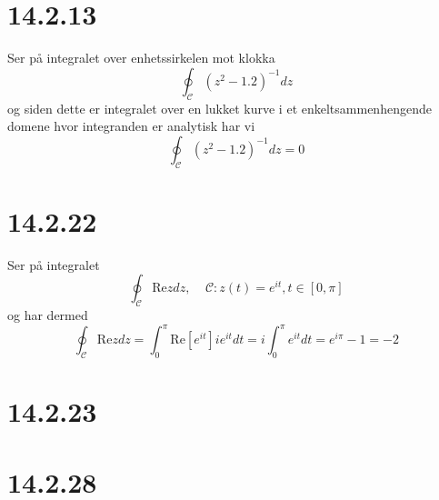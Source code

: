 \documentclass{report}
\newcommand{\nbrack}[1]{\left( #1 \right)}
\newcommand{\bbrack}[1]{\left[ #1 \right]}
\newcommand{\re}{\text{Re}}
\begin{document}
\section*{14.2.13}
Ser på integralet over enhetssirkelen mot klokka
\begin{equation}
  \label{eq:20}
  \oint_{\mathcal{C}} \nbrack{z^{2} - 1.2}^{-1} dz
\end{equation}
og siden dette er integralet over en lukket kurve i et enkeltsammenhengende domene hvor integranden er analytisk har vi
\begin{equation}
  \label{eq:22}
  \oint_{\mathcal{C}} \nbrack{z^{2} - 1.2}^{-1} dz = 0
\end{equation}

\section*{14.2.22}
Ser på integralet
\begin{equation}
  \label{eq:23}
  \oint_{\mathcal{C}} \re z dz, \;\;\;\; \mathcal{C} : z(t) = e^{it}, t\in \bbrack{ 0, \pi }
\end{equation}
og har dermed
\begin{equation}
  \label{eq:24}
  \oint_{\mathcal{C}} \re z dz = \int_{0}^{\pi} \re \bbrack{ e^{it} } ie^{it}dt = i\int_{0}^{\pi} e^{it} dt = e^{i\pi} - 1 = -2
\end{equation}


\section*{14.2.23}

\section*{14.2.28}
\end{document}
